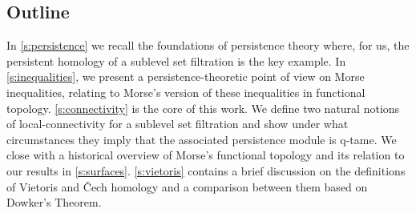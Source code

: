 



\subsection*{Outline}
In \cref{s:persistence} we recall the foundations of persistence theory where, for us, the persistent homology of a sublevel set filtration is the key example.
In \cref{s:inequalities}, we present a persistence-theoretic point of view on Morse inequalities, relating to Morse's version of these inequalities in functional topology.
\cref{s:connectivity} is the core of this work.
We define two natural notions of local-connectivity for a sublevel set filtration and show under what circumstances they imply that the associated persistence module is q-tame.
We close with a historical overview of Morse's functional topology and its relation to our results in \cref{s:surfaces}.
\cref{s:vietoris} contains a brief discussion on the definitions of Vietoris and \v{C}ech homology and a comparison between them based on Dowker's Theorem.